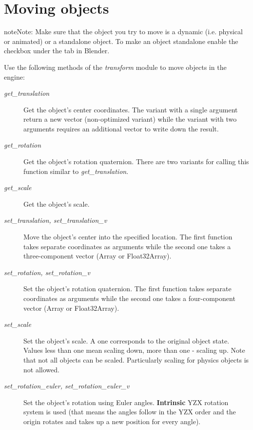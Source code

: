 \documentclass[a4paper,12pt,oneside]{sphinxmanual}
\begin{document}
\section{Moving objects}
\label{developers:id5}
\begin{notice}{note}{Note:}
Make sure that the object you try to move is a dynamic (i.e. physical or animated) or a standalone object. To make an object standalone enable the  checkbox under the  tab in Blender.
\end{notice}

Use the following methods of the \emph{transform} module to move objects in the engine:
\begin{description}
\item[{\emph{get\_translation}}] \leavevmode
Get the object's center coordinates. The variant with a single argument return a new vector (non-optimized variant) while the variant with two arguments requires an additional vector to write down the result.

\item[{\emph{get\_rotation}}] \leavevmode
Get the object's rotation quaternion. There are two variants for calling this function similar to \emph{get\_translation}.

\item[{\emph{get\_scale}}] \leavevmode
Get the object's scale.

\item[{\emph{set\_translation, set\_translation\_v}}] \leavevmode
Move the object's center into the specified location. The first function takes separate coordinates as arguments while the second one takes a three-component vector (Array or Float32Array).

\item[{\emph{set\_rotation, set\_rotation\_v}}] \leavevmode
Set the object's rotation quaternion. The first function takes separate coordinates as arguments while the second one takes a four-component vector (Array or Float32Array).

\item[{\emph{set\_scale}}] \leavevmode
Set the object's scale. A one corresponds to the original object state. Values less than one mean scaling down, more than one - scaling up. Note that not all objects can be scaled. Particularly scaling for physics objects is not allowed.

\item[{\emph{set\_rotation\_euler, set\_rotation\_euler\_v}}] \leavevmode
Set the object's rotation using Euler angles. \textbf{Intrinsic} YZX rotation system is used (that means the angles follow in the YZX order and the origin rotates and takes up a new position for every angle).

\end{description}
\end{document}
